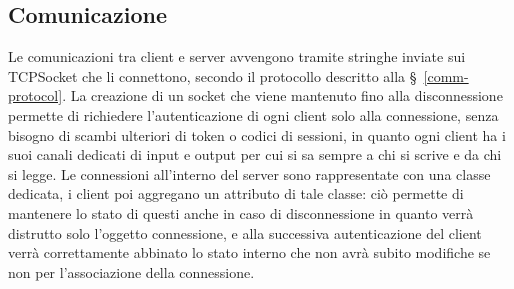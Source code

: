 \clearpage
\subsection{Comunicazione}

Le comunicazioni tra client e server avvengono tramite stringhe inviate sui TCPSocket che li connettono, secondo il protocollo descritto alla \S\ \ref{comm-protocol}. La creazione di un socket che viene mantenuto fino alla disconnessione permette di richiedere l'autenticazione di ogni client solo alla connessione, senza bisogno di scambi ulteriori di token o codici di sessioni, in quanto ogni client ha i suoi canali dedicati di input e output per cui si sa sempre a chi si scrive e da chi si legge. Le connessioni all'interno del server sono rappresentate con una classe dedicata, i client poi aggregano un attributo di tale classe: ciò permette di mantenere lo stato di questi anche in caso di disconnessione in quanto verrà distrutto solo l'oggetto connessione, e alla successiva autenticazione del client verrà correttamente abbinato lo stato interno che non avrà subito modifiche se non per l'associazione della connessione.
